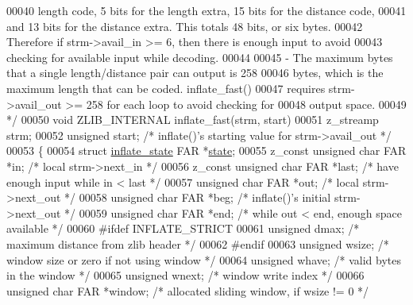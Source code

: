 \begin{DoxyCode}
{00040 \textcolor{comment}{      length code, 5 bits for the length extra, 15 bits for the distance code,}
00041 \textcolor{comment}{      and 13 bits for the distance extra.  This totals 48 bits, or six bytes.}
00042 \textcolor{comment}{      Therefore if strm->avail\_in >= 6, then there is enough input to avoid}
00043 \textcolor{comment}{      checking for available input while decoding.}
00044 \textcolor{comment}{}
00045 \textcolor{comment}{    - The maximum bytes that a single length/distance pair can output is 258}
00046 \textcolor{comment}{      bytes, which is the maximum length that can be coded.  inflate\_fast()}
00047 \textcolor{comment}{      requires strm->avail\_out >= 258 for each loop to avoid checking for}
00048 \textcolor{comment}{      output space.}
00049 \textcolor{comment}{ */}
00050 \textcolor{keywordtype}{void} ZLIB\_INTERNAL inflate\_fast(strm, start)
00051 z\_streamp strm;
00052 \textcolor{keywordtype}{unsigned} start;         \textcolor{comment}{/* inflate()'s starting value for strm->avail\_out */}
00053 \{
00054     \textcolor{keyword}{struct }\hyperlink{structinflate__state}{inflate\_state} FAR *\hyperlink{structstate}{state};
00055     z\_const \textcolor{keywordtype}{unsigned} \textcolor{keywordtype}{char} FAR *in;      \textcolor{comment}{/* local strm->next\_in */}
00056     z\_const \textcolor{keywordtype}{unsigned} \textcolor{keywordtype}{char} FAR *last;    \textcolor{comment}{/* have enough input while in < last */}
00057     \textcolor{keywordtype}{unsigned} \textcolor{keywordtype}{char} FAR *out;     \textcolor{comment}{/* local strm->next\_out */}
00058     \textcolor{keywordtype}{unsigned} \textcolor{keywordtype}{char} FAR *beg;     \textcolor{comment}{/* inflate()'s initial strm->next\_out */}
00059     \textcolor{keywordtype}{unsigned} \textcolor{keywordtype}{char} FAR *end;     \textcolor{comment}{/* while out < end, enough space available */}
00060 \textcolor{preprocessor}{#ifdef INFLATE\_STRICT}
00061     \textcolor{keywordtype}{unsigned} dmax;              \textcolor{comment}{/* maximum distance from zlib header */}
00062 \textcolor{preprocessor}{#endif}
00063     \textcolor{keywordtype}{unsigned} wsize;             \textcolor{comment}{/* window size or zero if not using window */}
00064     \textcolor{keywordtype}{unsigned} whave;             \textcolor{comment}{/* valid bytes in the window */}
00065     \textcolor{keywordtype}{unsigned} wnext;             \textcolor{comment}{/* window write index */}
00066     \textcolor{keywordtype}{unsigned} \textcolor{keywordtype}{char} FAR *window;  \textcolor{comment}{/* allocated sliding window, if wsize != 0 */}
}
\end{DoxyCode}
